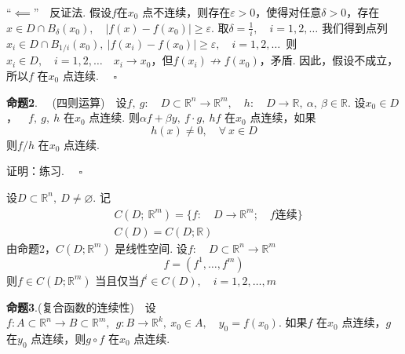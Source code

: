 \documentclass{article}
\begin{document}
\vspace{10pt}

“\( \impliedby \)”\ \ 反证法. 假设\(f\)在\(x_0\) 点不连续，则存在\(\varepsilon > 0\)，使得对任意\(\delta > 0\)，存在\(x \in D \cap B_{\delta  }(x_0),\quad | f(x) - f(x_0)| \ge \varepsilon  \). 取\(\delta = \frac{1}{i} ,\quad i = 1,2,\dots \) 我们得到点列\(x_i \in D \cap B_{1/i}(x_0),\ | f(x_i) - f(x_0) | \ge \varepsilon ,\quad i = 1,2,\dots  \)\ 则\(x_i \in D,\quad i = 1,2,\dots\quad x_i \to x_0 \)，但\(f(x_i) \not\to f(x_0)\)，矛盾. 因此，假设不成立，所以\(f\) 在\(x_0\) 点连续. \(\quad \square\)

\newpage

\textbf{命题2}. \ \ (四则运算)\ \ 设\(f,\ g:\quad D \subset \mathbb{R}^n \to \mathbb{R}^{m},\quad h:\quad D \to \mathbb{R},\ \alpha ,\ \beta  \in \mathbb{R}\). 设\(x_0 \in D\)，\(\quad f,\ g,\ h\) 在\(x_0\) 点连续. 则\(\alpha f + \beta y,\ f \cdot g,\ hf\) 在\(x_0\) 点连续，如果
\begin{equation*}
    h(x) \neq 0,\quad \forall\ x \in D
\end{equation*}
则\(f/h\) 在\(x_0\) 点连续.

\vspace{10pt}

证明：练习. \(\quad  \square\)

\vspace{10pt}

设\(D \subset \mathbb{R}^n,\ D \neq \varnothing \). 记
\begin{align*}
    & C(D;\ \mathbb{R}^{m}) = \{f:\quad D \to \mathbb{R}^{m};\quad f \text{连续} \} \\
    & C(D) = C(D;\mathbb{R})
\end{align*}
由命题2，\(C(D;\mathbb{R}^{m})\) 是线性空间. 设\(f:\quad D \subset \mathbb{R}^n \to \mathbb{R}^{m}\)
\begin{equation*}
    f = (f^1, \dots ,f^m)
\end{equation*}
则\(f \in C(D;\mathbb{R}^{m})\) 当且仅当\(f^i \in C(D),\quad i = 1,2,\dots ,m\)

\newpage

\textbf{命题3}.(复合函数的连续性)\ \ 设\(f:A \subset \mathbb{R}^n \to B \subset \mathbb{R}^{m},\ \ g:B \to \mathbb{R}^{k},\ x_0 \in A,\quad y_0 = f(x_0) \). 如果\(f\) 在\(x_0\) 点连续，\(g\) 在\(y_0\) 点连续，则\(g \circ f\) 在\(x_0\) 点连续.

\vspace{10pt}
\end{document}
